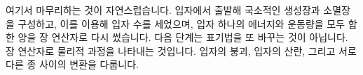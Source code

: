 \begin{classroomqa}
\end{classroomqa}

여기서 마무리하는 것이 자연스럽습니다. 입자에서 출발해 국소적인 생성장과 소멸장을 구성하고, 이를 이용해 입자 수를 세었으며, 입자 하나의 에너지와 운동량을 모두 합한 양을 장 연산자로 다시 썼습니다. 다음 단계는 표기법을 또 바꾸는 것이 아닙니다. 장 연산자로 물리적 과정을 나타내는 것입니다. 입자의 붕괴, 입자의 산란, 그리고 서로 다른 종 사이의 변환을 다룹니다.
